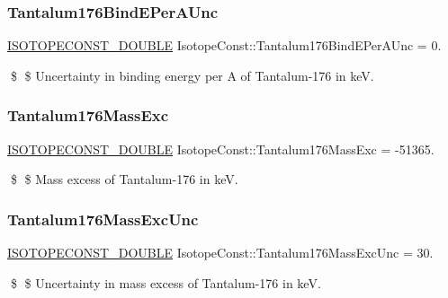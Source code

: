 \subsubsection{\texorpdfstring{Tantalum176\+Bind\+E\+Per\+A\+Unc}{Tantalum176BindEPerAUnc}}
{\footnotesize\ttfamily \mbox{\hyperlink{group___isotope_const-_macros_ga8f45a7272ce02c0b4c65c44636ed719a}{I\+S\+O\+T\+O\+P\+E\+C\+O\+N\+S\+T\+\_\+\+D\+O\+U\+B\+LE}} Isotope\+Const\+::\+Tantalum176\+Bind\+E\+Per\+A\+Unc = 0.}

\$ \$ Uncertainty in binding energy per A of Tantalum-\/176 in keV. \mbox{\label{group___isotope_const-_tantalum-_ta176_gaabad5b22ab61c04424b799ca45cebc8c}} 
\subsubsection{\texorpdfstring{Tantalum176\+Mass\+Exc}{Tantalum176MassExc}}
{\footnotesize\ttfamily \mbox{\hyperlink{group___isotope_const-_macros_ga8f45a7272ce02c0b4c65c44636ed719a}{I\+S\+O\+T\+O\+P\+E\+C\+O\+N\+S\+T\+\_\+\+D\+O\+U\+B\+LE}} Isotope\+Const\+::\+Tantalum176\+Mass\+Exc = -\/51365.}

\$ \$ Mass excess of Tantalum-\/176 in keV. \mbox{\label{group___isotope_const-_tantalum-_ta176_gae60d79f8a3f743c503e89f0547d72cf9}} 
\subsubsection{\texorpdfstring{Tantalum176\+Mass\+Exc\+Unc}{Tantalum176MassExcUnc}}
{\footnotesize\ttfamily \mbox{\hyperlink{group___isotope_const-_macros_ga8f45a7272ce02c0b4c65c44636ed719a}{I\+S\+O\+T\+O\+P\+E\+C\+O\+N\+S\+T\+\_\+\+D\+O\+U\+B\+LE}} Isotope\+Const\+::\+Tantalum176\+Mass\+Exc\+Unc = 30.}

\$ \$ Uncertainty in mass excess of Tantalum-\/176 in keV. \mbox{\label{group___isotope_const-_tantalum-_ta176_gafd1ee9b95c2f2d59f0043d84afc6422b}} 

